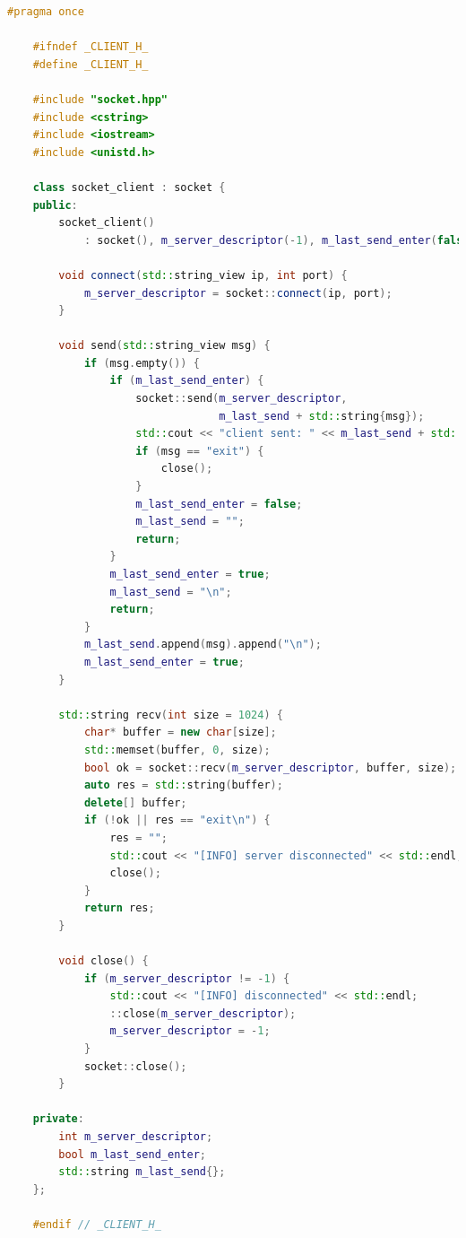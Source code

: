 \documentclass{article}
\begin{document}
\begin{lstlisting}[language=C++]
    #pragma once

    #ifndef _CLIENT_H_
    #define _CLIENT_H_
    
    #include "socket.hpp"
    #include <cstring>
    #include <iostream>
    #include <unistd.h>
    
    class socket_client : socket {
    public:
        socket_client()
            : socket(), m_server_descriptor(-1), m_last_send_enter(false) {}
    
        void connect(std::string_view ip, int port) {
            m_server_descriptor = socket::connect(ip, port);
        }
    
        void send(std::string_view msg) {
            if (msg.empty()) {
                if (m_last_send_enter) {
                    socket::send(m_server_descriptor,
                                 m_last_send + std::string{msg});
                    std::cout << "client sent: " << m_last_send + std::string{msg} << std::endl;
                    if (msg == "exit") {
                        close();
                    }
                    m_last_send_enter = false;
                    m_last_send = "";
                    return;
                }
                m_last_send_enter = true;
                m_last_send = "\n";
                return;
            }
            m_last_send.append(msg).append("\n");
            m_last_send_enter = true;
        }
    
        std::string recv(int size = 1024) {
            char* buffer = new char[size];
            std::memset(buffer, 0, size);
            bool ok = socket::recv(m_server_descriptor, buffer, size);
            auto res = std::string(buffer);
            delete[] buffer;
            if (!ok || res == "exit\n") {
                res = "";
                std::cout << "[INFO] server disconnected" << std::endl;
                close();
            }
            return res;
        }
    
        void close() {
            if (m_server_descriptor != -1) {
                std::cout << "[INFO] disconnected" << std::endl;
                ::close(m_server_descriptor);
                m_server_descriptor = -1;
            }
            socket::close();
        }
    
    private:
        int m_server_descriptor;
        bool m_last_send_enter;
        std::string m_last_send{};
    };
    
    #endif // _CLIENT_H_    
\end{lstlisting}
\end{document}
